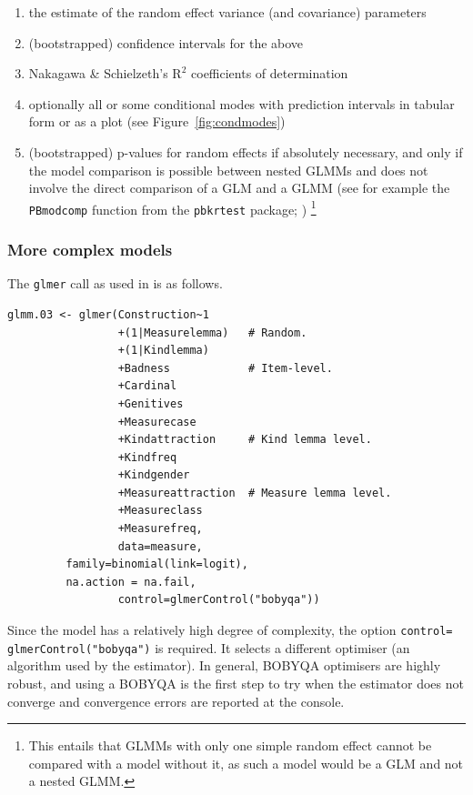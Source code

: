 \begin{enumerate}
  \item the estimate of the random effect variance (and covariance) parameters
  \item (bootstrapped) confidence intervals for the above
  \item Nakagawa \& Schielzeth's $\textrm{R}^{\textrm{2}}$ coefficients of determination
  \item optionally all or some conditional modes with prediction intervals in tabular form or as a plot (see Figure~\ref{fig:condmodes})
  \item (bootstrapped) p-values for random effects if absolutely necessary, and only if the model comparison is possible between nested GLMMs and does not involve the direct comparison of a GLM and a GLMM (see for example the \texttt{PBmodcomp} function from the \texttt{pbkrtest} package; \citealt{HalekohHojsgaard2014})%
    \footnote{This entails that GLMMs with only one simple random effect cannot be compared with a model without it, as such a model would be a GLM and not a nested GLMM.}
\end{enumerate}

\subsubsection{More complex models}
\label{sec:morecomplexmodelspractical}

The \texttt{glmer} call as used in \citet{Schaefer2018} is as follows.

\vspace{0.5\baselineskip}

\begin{lstlisting}
glmm.03 <- glmer(Construction~1
                 +(1|Measurelemma)   # Random.
                 +(1|Kindlemma)
                 +Badness            # Item-level.
                 +Cardinal
                 +Genitives
                 +Measurecase
                 +Kindattraction     # Kind lemma level.
                 +Kindfreq
                 +Kindgender
                 +Measureattraction  # Measure lemma level.
                 +Measureclass
                 +Measurefreq,
                 data=measure,
		 family=binomial(link=logit),
		 na.action = na.fail,
                 control=glmerControl("bobyqa"))
\end{lstlisting}

Since the model has a relatively high degree of complexity, the option \texttt{control=} \texttt{glmerControl("bobyqa")} is required.
It selects a different optimiser (an algorithm used by the estimator).
In general, BOBYQA optimisers are highly robust, and using a BOBYQA is the first step to try when the estimator does not converge and convergence errors are reported at the console.

